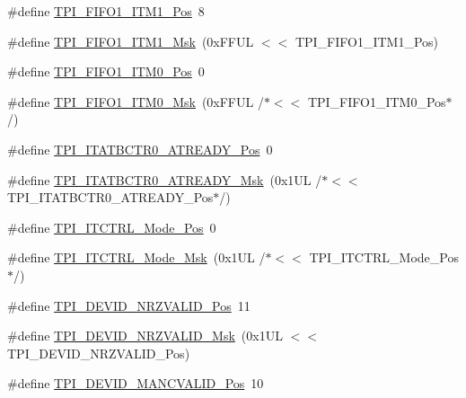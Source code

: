 \begin{DoxyCompactItemize}
\item 
\#define \hyperlink{group___c_m_s_i_s___t_p_i_gaece86ab513bc3d0e0a9dbd82258af49f}{T\+P\+I\+\_\+\+F\+I\+F\+O1\+\_\+\+I\+T\+M1\+\_\+\+Pos}~8
\item 
\#define \hyperlink{group___c_m_s_i_s___t_p_i_ga3347f42828920dfe56e3130ad319a9e6}{T\+P\+I\+\_\+\+F\+I\+F\+O1\+\_\+\+I\+T\+M1\+\_\+\+Msk}~(0x\+F\+F\+U\+L $<$$<$ T\+P\+I\+\_\+\+F\+I\+F\+O1\+\_\+\+I\+T\+M1\+\_\+\+Pos)
\item 
\#define \hyperlink{group___c_m_s_i_s___t_p_i_ga2188671488417a52abb075bcd4d73440}{T\+P\+I\+\_\+\+F\+I\+F\+O1\+\_\+\+I\+T\+M0\+\_\+\+Pos}~0
\item 
\#define \hyperlink{group___c_m_s_i_s___t_p_i_ga8ae09f544fc1a428797e2a150f14a4c9}{T\+P\+I\+\_\+\+F\+I\+F\+O1\+\_\+\+I\+T\+M0\+\_\+\+Msk}~(0x\+F\+F\+U\+L /$\ast$$<$$<$ T\+P\+I\+\_\+\+F\+I\+F\+O1\+\_\+\+I\+T\+M0\+\_\+\+Pos$\ast$/)
\item 
\#define \hyperlink{group___c_m_s_i_s___t_p_i_gab1eb6866c65f02fa9c83696b49b0f346}{T\+P\+I\+\_\+\+I\+T\+A\+T\+B\+C\+T\+R0\+\_\+\+A\+T\+R\+E\+A\+D\+Y\+\_\+\+Pos}~0
\item 
\#define \hyperlink{group___c_m_s_i_s___t_p_i_gaee320b3c60f9575aa96a8742c4ff9356}{T\+P\+I\+\_\+\+I\+T\+A\+T\+B\+C\+T\+R0\+\_\+\+A\+T\+R\+E\+A\+D\+Y\+\_\+\+Msk}~(0x1\+U\+L /$\ast$$<$$<$ T\+P\+I\+\_\+\+I\+T\+A\+T\+B\+C\+T\+R0\+\_\+\+A\+T\+R\+E\+A\+D\+Y\+\_\+\+Pos$\ast$/)
\item 
\#define \hyperlink{group___c_m_s_i_s___t_p_i_gaa847adb71a1bc811d2e3190528f495f0}{T\+P\+I\+\_\+\+I\+T\+C\+T\+R\+L\+\_\+\+Mode\+\_\+\+Pos}~0
\item 
\#define \hyperlink{group___c_m_s_i_s___t_p_i_gad6f87550b468ad0920d5f405bfd3f017}{T\+P\+I\+\_\+\+I\+T\+C\+T\+R\+L\+\_\+\+Mode\+\_\+\+Msk}~(0x1\+U\+L /$\ast$$<$$<$ T\+P\+I\+\_\+\+I\+T\+C\+T\+R\+L\+\_\+\+Mode\+\_\+\+Pos$\ast$/)
\item 
\#define \hyperlink{group___c_m_s_i_s___t_p_i_ga9f46cf1a1708575f56d6b827766277f4}{T\+P\+I\+\_\+\+D\+E\+V\+I\+D\+\_\+\+N\+R\+Z\+V\+A\+L\+I\+D\+\_\+\+Pos}~11
\item 
\#define \hyperlink{group___c_m_s_i_s___t_p_i_gacecc8710a8f6a23a7d1d4f5674daf02a}{T\+P\+I\+\_\+\+D\+E\+V\+I\+D\+\_\+\+N\+R\+Z\+V\+A\+L\+I\+D\+\_\+\+Msk}~(0x1\+U\+L $<$$<$ T\+P\+I\+\_\+\+D\+E\+V\+I\+D\+\_\+\+N\+R\+Z\+V\+A\+L\+I\+D\+\_\+\+Pos)
\item 
\#define \hyperlink{group___c_m_s_i_s___t_p_i_ga675534579d9e25477bb38970e3ef973c}{T\+P\+I\+\_\+\+D\+E\+V\+I\+D\+\_\+\+M\+A\+N\+C\+V\+A\+L\+I\+D\+\_\+\+Pos}~10
\item 

\end{DoxyCompactItemize}
